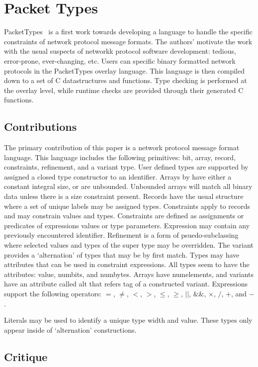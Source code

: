 \section{Packet Types}

PacketTypes~\cite{packet_types} is a first work towards developing a
language to handle the specific constraints of network protocol
message formats. The authors' motivate the work with the usual suspects
of networkk protocol software development: tedious, error-prone, ever-changing,
etc. Users can specific binary formatted network protocols in the PacketTypes
overlay language. This language is then compiled down to a set of C
datastructures and functions. Type checking is performed at the overlay level,
while runtime checks are provided through their generated C functions. 

\subsection{Contributions}

The primary contribution of this paper is a network protocol message format
language. This language includes the following primitives: bit, array, record,
constraints, refinement, and a variant type. User defined types are supported 
by assigned a closed type constructor to an identifier. Arrays by have either
a constant integral size, or are unbounded. Unbounded arrays will match all
binary data unless there is a size constraint present. Records have the usual
structure where a set of unique labels may be assigned types. Constraints
apply to records and may constrain values and types. Constraints are defined
as assignments or predicates of expressions values or type parameters.
Expression may contain any previously encountered identifier. Refinement is a
form of psuedo-subclassing where selected values and types of the super type may
be overridden. The variant provides a `alternation' of types that may be
by first match. Types may have attributes that can be used in constraint
expressions. All types seem to have the attributes: value, numbits, and
numbytes. Arrays have numelements, and variants have an attribute called alt
that refers tag of a constructed variant. Expressions support the following
operators: $=$, $\neq$, $<$, $>$, $\leq$, $\geq$, $||$, $\&\&$, $\times$,
$/$, $+$, and $-$.

Literals may be used to identify a unique type width and value. These types
only appear inside of `alternation' constructions.

\subsection{Critique}

